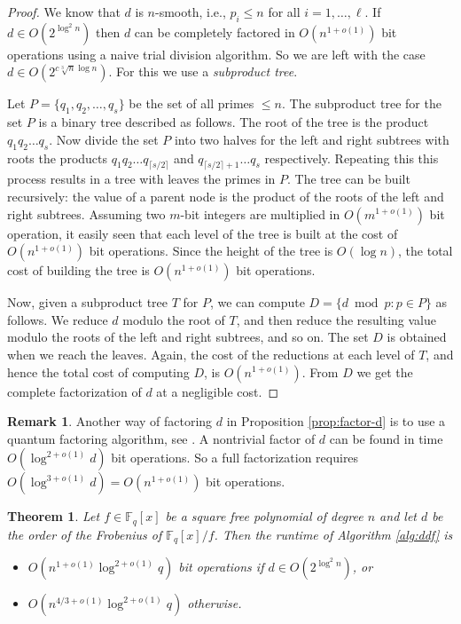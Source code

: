 \documentclass{article}
\theoremstyle{plain}
\newtheorem{theorem}{Theorem}
\theoremstyle{definition}
\newtheorem*{remark}{Remark}
\def\F{\ensuremath{\mathbb{F}}}
\begin{document}
\begin{proof}
	We know that $d$ is $n$-smooth, i.e., $p_i \le n$ for all $i = 1, \dots, \ell$. If $d \in 
	O(2^{\log^2n})$ then $d$ can be completely factored in $O(n^{1 + o(1)})$ bit operations using a 
	naive trial division algorithm. So we are left with the case $d \in O(2^{c\sqrt[3]{n} \log 
	n})$. For this we use a \textit{subproduct tree}.
	
	Let $P = \{ q_1, q_2, \dots, q_s \}$ be the set of all primes $\le n$. The subproduct tree for 
	the set $P$ is a binary tree described as follows. The root of the tree is the product $q_1 q_2 
	\dots q_s$. Now divide the set $P$ into two halves for the left and right subtrees with roots 
	the products $q_1 q_2 \dots q_{\lceil s / 2 \rceil}$ and $q_{\lceil s / 2 \rceil + 1} \dots 
	q_s$ respectively. Repeating this this process results in a tree with leaves the primes in 
	$P$. The tree can be built recursively: the value of a parent node is the product of the roots 
	of the left and right subtrees. Assuming two $m$-bit integers are multiplied in $O(m^{1 + 
	o(1)})$ bit operation, it easily seen that each level of the tree is built at the cost of 
	$O(n^{1 + o(1)})$ bit operations. Since the height of the tree is $O(\log n)$, the total cost 
	of building the tree is $O(n^{1 + o(1)})$ bit operations.
	
	Now, given a subproduct tree $T$ for $P$, we can compute $D = \{ d \bmod p : p \in P \}$ as 
	follows. We reduce $d$ modulo the root of $T$, and then reduce the resulting value modulo the 
	roots of the left and right subtrees, and so on. The set $D$ is obtained when we reach the 
	leaves. Again, the cost of the reductions at each level of $T$, and hence the total cost of 
	computing $D$, is $O(n^{1 + o(1)})$. From $D$ we get the complete factorization of $d$ at a 
	negligible cost.
\end{proof}
\begin{remark}
	Another way of factoring $d$ in Proposition \ref{prop:factor-d} is to use a quantum factoring 
	algorithm, see \cite{kaye2007introduction}. A nontrivial factor of $d$ can be found in time 
	$O(\log^{2 + o(1)}d)$ bit operations. So a full factorization requires $O(\log^{3 + o(1)}d) 
	= O(n^{1 + o(1)})$ bit operations. 
\end{remark}
\begin{theorem}\label{theo:main}
	Let $f \in \F_q[x]$ be a square free polynomial of degree $n$ and let $d$ be the order of the 
	Frobenius of $\F_q[x] / f$. Then the runtime of Algorithm \ref{alg:ddf} is
	\begin{itemize}
		\item $O(n^{1 + o(1)} \log^{2 + o(1)}q)$ bit operations if $d \in O(2^{\log^2n})$, or
		\item $O(n^{4 / 3 + o(1)} \log^{2 + o(1)}q)$ otherwise.
	\end{itemize}
\end{theorem}
\end{document}

